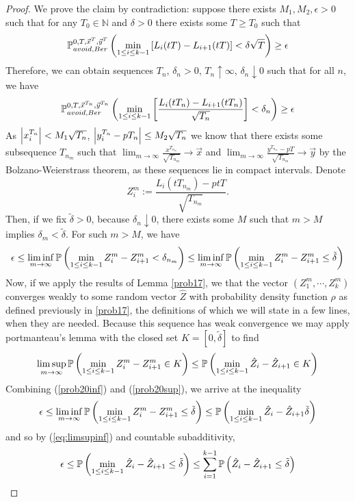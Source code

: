 \begin{proof}
	We prove the claim by contradiction:
	suppose there exists $M_1,M_2,\epsilon>0$ such that for any $T_0\in \mathbb{N}$ and $\delta>0$ there exists some $T\geq T_0$ such that \[
	\pr^{0,T,\vec x^T,\vec y^T}_{avoid, Ber}\left(\min_{1\leq i\leq k-1}\left[L_i(tT)-L_{i+1}(tT)\right]<\delta\sqrt{T}\right)\geq \epsilon
	\]
	Therefore, we can obtain sequences $T_n$, $\delta_n>0$, $T_n\uparrow \infty$, $\delta_n\downarrow 0$ such that for all $n$, we have  
	\[
	\pr^{0,T,\vec x^{T_n},\vec y^{T_n}}_{avoid, Ber}\left(\min_{1\leq i\leq k-1}\left[\frac{L_i(tT_n)-L_{i+1}(tT_n)}{\sqrt{T_n}}\right]<\delta_n\right)\geq \epsilon
	\]
	As $\abs*{x_i^{T_n}}<M_1\sqrt{T_n}$, $\abs*{y_i^{T_n}-pT_n}\leq M_2\sqrt{T_n}$ we know that there exists some subsequence $T_{n_m}$ such that $\lim_{m\to\infty} \frac{x^{T_{n_m}}}{\sqrt{T_{n_m}}}\to \vec x$ 
	and 
	$\lim_{m\to\infty}\frac{y^{T_{n_m}}-pT}{\sqrt{T_{n_m}}}\to \vec y$ 
	by the Bolzano-Weierstrass theorem, as these sequences lie in compact intervals. Denote $$Z_i^m:=\frac{L_i(tT_{n_m})-ptT}{\sqrt{T_{n_m}}}.$$ Then, if we fix $\tilde\delta>0$, because $\delta_n\downarrow 0$, there exists some $M$ such that $m>M$ implies $\delta_m<\tilde\delta$. For such $m>M$, we have 
	\begin{equation}\label{prob20inf}
	\epsilon\leq \liminf_{m\to\infty}\pr\left(\min_{1\leq i\leq k-1}Z_i^m-Z_{i+1}^m<\delta_{n_m}\right)\leq \liminf_{m\to\infty}\pr\left(\min_{1\leq i\leq k-1}Z_i^m-Z_{i+1}^m\leq\tilde\delta\right)
	\end{equation}
	Now, if we apply the results of Lemma \ref{prob17}, we that the vector $(Z_1^m,\cdots, Z_k^m)$ converges weakly to some random vector $\hat Z$ with probability density function $\rho$ as defined previously in \ref{prob17}, the definitions of which we will state in a few lines, when  they are needed.
	Because this sequence has weak convergence we may apply portmanteau's lemma with the closed set $K=[0,\tilde\delta]$ to find 
	\begin{equation}\label{prob20sup}
	\limsup_{m\to\infty }\pr\left(\min_{1\leq i\leq k-1}Z_i^m-Z_{i+1}^m\in K\right)\leq \pr\left(\min_{1\leq i\leq k-1}\hat Z_i-\hat Z_{i+1}\in K\right)
	\end{equation}
	Combining (\ref{prob20inf}) and (\ref{prob20sup}), we arrive at the inequality
	\begin{equation}\label{eq:limsupinf}
	\epsilon\leq \liminf_{m\to\infty}\pr\left(\min_{1\leq i\leq k-1} Z_i^m-Z_{i+1}^m\leq \tilde\delta\right)\leq \pr\left(\min_{1\leq i\leq k-1} \hat Z_i-\hat Z_{i+1}\tilde\delta\right)
	\end{equation}
	and so by (\ref{eq:limsupinf}) and countable subadditivity,
	\begin{equation}\label{eq:ineq}
	\epsilon\leq \pr\left(\min_{1\leq i\leq k-1} \hat Z_i-\hat Z_{i+1}\leq\tilde\delta\right)\leq \sum_{i=1}^{k-1}\pr\left(\hat Z_i-\hat Z_{i+1}\leq \tilde\delta\right)
	\end{equation}
	

\end{proof}

